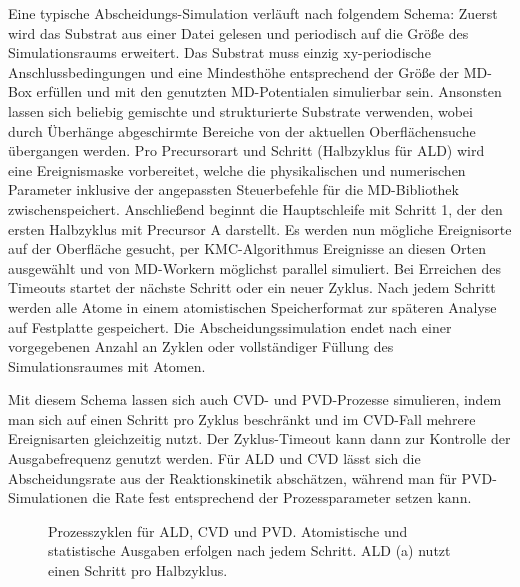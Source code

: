 Eine typische Abscheidungs-Simulation verläuft nach folgendem Schema:
Zuerst wird das Substrat aus einer Datei gelesen und periodisch auf die Größe des Simulationsraums erweitert.
Das Substrat muss einzig xy-periodische Anschlussbedingungen und eine Mindesthöhe entsprechend der Größe der MD-Box erfüllen und mit den genutzten MD-Potentialen simulierbar sein.
Ansonsten lassen sich beliebig gemischte und strukturierte Substrate verwenden, wobei durch Überhänge abgeschirmte Bereiche von der aktuellen Oberflächensuche übergangen werden.
Pro Precursorart und Schritt (Halbzyklus für ALD) wird eine Ereignismaske vorbereitet, welche die physikalischen und numerischen Parameter inklusive der angepassten Steuerbefehle für die MD-Bibliothek zwischenspeichert.
Anschließend beginnt die Hauptschleife mit Schritt 1, der den ersten Halbzyklus mit Precursor A darstellt.
Es werden nun mögliche Ereignisorte auf der Oberfläche gesucht, per KMC-Algorithmus Ereignisse an diesen Orten ausgewählt und von MD-Workern möglichst parallel simuliert.
Bei Erreichen des Timeouts startet der nächste Schritt oder ein neuer Zyklus.
Nach jedem Schritt werden alle Atome in einem atomistischen Speicherformat zur späteren Analyse auf Festplatte gespeichert.
Die Abscheidungssimulation endet nach einer vorgegebenen Anzahl an Zyklen oder vollständiger Füllung des Simulationsraumes mit Atomen.

Mit diesem Schema lassen sich auch CVD- und PVD-Prozesse simulieren, indem man sich auf einen Schritt pro Zyklus beschränkt und im CVD-Fall mehrere Ereignisarten gleichzeitig nutzt.
Der Zyklus-Timeout kann dann zur Kontrolle der Ausgabefrequenz genutzt werden.
Für ALD und CVD lässt sich die Abscheidungsrate aus der Reaktionskinetik abschätzen, während man für PVD-Simulationen die Rate fest entsprechend der Prozessparameter setzen kann.

\begin{figure}
  \captionsetup[subfigure]{singlelinecheck=false}
  \begin{subfigure}[t]{5.7cm}
    \def\svgwidth{\textwidth}
    
  \end{subfigure}
  \hfill
  \begin{subfigure}[t]{4.7cm}
    \def\svgwidth{\textwidth}
    
  \end{subfigure}
  \hfill
  \begin{subfigure}[t]{3cm}
    \def\svgwidth{\textwidth}
    
  \end{subfigure}
  \caption[Prozesszyklen für ALD, CVD und PVD]{
    Prozesszyklen für ALD, CVD und PVD.
    Atomistische und statistische Ausgaben erfolgen nach jedem Schritt.
    ALD (a) nutzt einen Schritt pro Halbzyklus.
  }
  \label{fig:parsivald-modes}
\end{figure}

